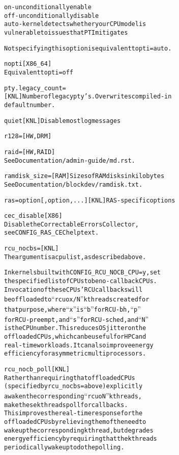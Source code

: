 \documentclass[a4paper,8pt,english]{sphinxmanual}
\begin{document}
\begin{alltt}
                        on   - unconditionally enable
                        off  - unconditionally disable
                        auto - kernel detects whether your CPU model is
                               vulnerable to issues that PTI mitigates

                        Not specifying this option is equivalent to pti=auto.

        nopti           {[}X86\_64{]}
                        Equivalent to pti=off

        pty.legacy\_count=
                        {[}KNL{]} Number of legacy pty's. Overwrites compiled-in
                        default number.

        quiet           {[}KNL{]} Disable most log messages

        r128=           {[}HW,DRM{]}

        raid=           {[}HW,RAID{]}
                        See Documentation/admin-guide/md.rst.

        ramdisk\_size=   {[}RAM{]} Sizes of RAM disks in kilobytes
                        See Documentation/blockdev/ramdisk.txt.

        ras=option{[},option,...{]} {[}KNL{]} RAS-specific options

                cec\_disable     {[}X86{]}
                                Disable the Correctable Errors Collector,
                                see CONFIG\_RAS\_CEC help text.

        rcu\_nocbs=      {[}KNL{]}
                        The argument is a cpu list, as described above.

                        In kernels built with CONFIG\_RCU\_NOCB\_CPU=y, set
                        the specified list of CPUs to be no-callback CPUs.
                        Invocation of these CPUs' RCU callbacks will
                        be offloaded to ``rcuox/N'' kthreads created for
                        that purpose, where ``x'' is ``b'' for RCU-bh, ``p''
                        for RCU-preempt, and ``s'' for RCU-sched, and ``N''
                        is the CPU number.  This reduces OS jitter on the
                        offloaded CPUs, which can be useful for HPC and
                        real-time workloads.  It can also improve energy
                        efficiency for asymmetric multiprocessors.

        rcu\_nocb\_poll   {[}KNL{]}
                        Rather than requiring that offloaded CPUs
                        (specified by rcu\_nocbs= above) explicitly
                        awaken the corresponding ``rcuoN'' kthreads,
                        make these kthreads poll for callbacks.
                        This improves the real-time response for the
                        offloaded CPUs by relieving them of the need to
                        wake up the corresponding kthread, but degrades
                        energy efficiency by requiring that the kthreads
                        periodically wake up to do the polling.


\end{alltt}
\end{document}
